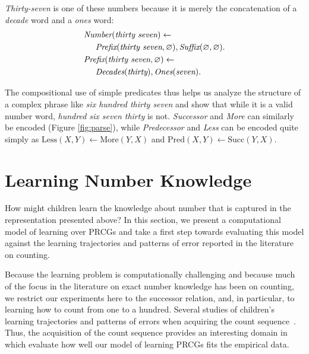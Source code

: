 \documentclass[10pt,letterpaper]{article}
\begin{document}
\noindent\emph{Thirty-seven} is one of these numbers because it is
merely the concatenation of a \emph{decade} word and a \emph{ones}
word:
\begin{align}
  & \textit{Number}(\textit{thirty seven}) \leftarrow\\
  & \hspace{0.5cm} \textit{Prefix}(\textit{thirty seven}, \varnothing), \textit{Suffix}(\varnothing,\varnothing).\notag\\
  & \textit{Prefix}(\textit{thirty seven}, \varnothing) \leftarrow\\
  & \hspace{0.5cm} \textit{Decades}(\textit{thirty}), \textit{Ones}(\textit{seven}).\notag
\end{align}


\noindent The compositional use of simple predicates thus helps us
analyze the structure of a complex phrase like \emph{six hundred
  thirty seven} and show that while it is a valid number word,
\emph{hundred six seven thirty} is not. \emph{Successor} and
\emph{More} can similarly be encoded (Figure \ref{fig:parse}), while
\emph{Predecessor} and \emph{Less} can be encoded quite simply as
$\text{Less}(X,Y) \leftarrow \text{More}(Y,X)$ and $\text{Pred}(X,Y)
\leftarrow \text{Succ}(Y,X)$.

\section{Learning Number Knowledge}

How might children learn the knowledge about number that is captured
in the representation presented above? In this section, we present a
computational model of learning over PRCGs and take a first step
towards evaluating this model against the learning trajectories and
patterns of error reported in the literature on counting. 

Because the learning problem is computationally challenging and
because much of the focus in the literature on exact number knowledge
has been on counting, we restrict our experiments here to the
successor relation, and, in particular, to learning how to count from
one to a hundred. Several studies of children's learning trajectories
and patterns of errors when acquiring the count
sequence~\citep{FusRicBriar1982,miller1987counting}. Thus, the
acquisition of the count sequence provides an interesting domain in
which evaluate how well our model of learning PRCGs fits the empirical
data.
\end{document}
